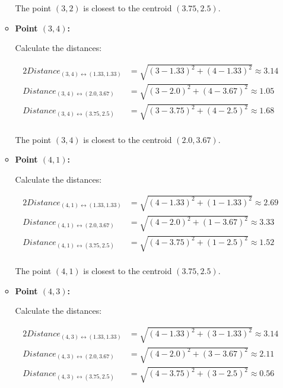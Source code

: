 \documentclass[
english,
smallborders
]{i6prcsht}
\begin{document}
\begin{solution}
\begin{enumerate}
\begin{itemize}
			            The point $(3,2)$ is closest to the centroid $(3.75,2.5)$.

			      \item \textbf{Point $(3,4)$:}

			            Calculate the distances:

			            \begin{alignat*}{2}
				            Distance_{(3,4)\leftrightarrow(1.33,1.33)} & = \sqrt{(3-1.33)^2+(4-1.33)^2} \approx 3.14 \\
				            Distance_{(3,4)\leftrightarrow(2.0,3.67)}  & = \sqrt{(3-2.0)^2+(4-3.67)^2} \approx 1.05  \\
				            Distance_{(3,4)\leftrightarrow(3.75,2.5)}  & = \sqrt{(3-3.75)^2+(4-2.5)^2} \approx 1.68  \\
			            \end{alignat*}

			            The point $(3,4)$ is closest to the centroid $(2.0,3.67)$.

			      \item \textbf{Point $(4,1)$:}

			            Calculate the distances:

			            \begin{alignat*}{2}
				            Distance_{(4,1)\leftrightarrow(1.33,1.33)} & = \sqrt{(4-1.33)^2+(1-1.33)^2} \approx 2.69 \\
				            Distance_{(4,1)\leftrightarrow(2.0,3.67)}  & = \sqrt{(4-2.0)^2+(1-3.67)^2} \approx 3.33  \\
				            Distance_{(4,1)\leftrightarrow(3.75,2.5)}  & = \sqrt{(4-3.75)^2+(1-2.5)^2} \approx 1.52  \\
			            \end{alignat*}

			            The point $(4,1)$ is closest to the centroid $(3.75,2.5)$.

			      \item \textbf{Point $(4,3)$:}

			            Calculate the distances:

			            \begin{alignat*}{2}
				            Distance_{(4,3)\leftrightarrow(1.33,1.33)} & = \sqrt{(4-1.33)^2+(3-1.33)^2} \approx 3.14 \\
				            Distance_{(4,3)\leftrightarrow(2.0,3.67)}  & = \sqrt{(4-2.0)^2+(3-3.67)^2} \approx 2.11  \\
				            Distance_{(4,3)\leftrightarrow(3.75,2.5)}  & = \sqrt{(4-3.75)^2+(3-2.5)^2} \approx 0.56  \\
			            \end{alignat*}


\end{itemize}
\end{enumerate}
\end{solution}
\end{document}
